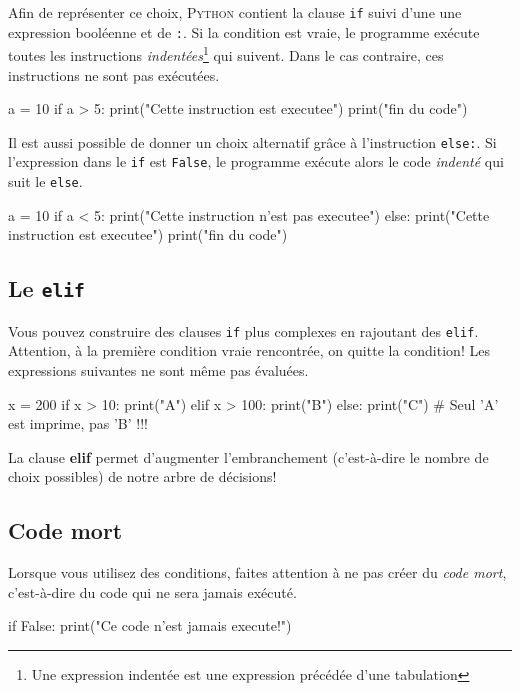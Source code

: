 Afin de représenter ce choix, \textsc{Python} contient la clause \texttt{if} suivi d'une une expression booléenne et de \texttt{:}. Si la condition est vraie, le programme exécute toutes les instructions \textit{indentées}\footnote{Une expression indentée est une expression précédée d'une tabulation} qui suivent. Dans le cas contraire, ces instructions ne sont pas exécutées.

\begin{python}[caption = l'instruction if]
a = 10
if a > 5:
    print("Cette instruction est executee")
print("fin du code")
\end{python}
Il est aussi possible de donner un choix alternatif grâce à l'instruction \texttt{else:}. Si l'expression dans le \texttt{if} est \texttt{False}, le programme exécute alors le code \textit{indenté} qui suit le \texttt{else}.
\begin{python}
a = 10
if a < 5:
    print("Cette instruction n'est pas executee")
else:
    print("Cette instruction est executee")
print("fin du code")
\end{python}

\subsection{Le \texttt{elif}}
Vous pouvez construire des clauses \texttt{if} plus complexes en rajoutant des \texttt{elif}. Attention, à la première condition vraie rencontrée, on quitte la condition! Les expressions suivantes ne sont même pas évaluées.

\begin{python}[caption = utilisation de elif]
x = 200
if x > 10:
    print("A")
elif x > 100:
    print("B")
else:
    print("C")
# Seul 'A' est imprime, pas 'B' !!!
\end{python}
La clause \textbf{elif} permet d'augmenter l'embranchement 
(c'est-à-dire le nombre de choix possibles) de notre arbre de décisions!

\subsection{Code mort}

Lorsque vous utilisez des conditions, faites attention à ne pas créer du \textit{code mort}, c'est-à-dire du code qui ne sera jamais exécuté.
\begin{python}[caption = Exemple de code mort]
if False:
    print("Ce code n'est jamais execute!")
\end{python}

